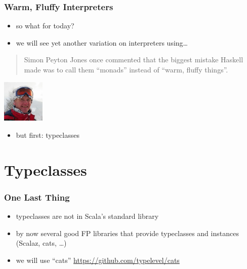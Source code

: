 \documentclass{beamer}
\begin{document}
\begin{frame}
  \frametitle{Warm, Fluffy Interpreters}
  \begin{itemize}
  \item so what for today?
  \item we will see yet another variation on interpreters using\ldots
  \end{itemize}
  \vspace{5mm}
  \begin{minipage}{0.75\linewidth}
    \begin{quote}
      Simon Peyton Jones once commented that the biggest mistake Haskell
      made was to call them ``monads'' instead of ``warm, fluffy things''.
    \end{quote}
  \end{minipage}
  \begin{minipage}{25mm}
    \includegraphics[width=2cm]{pics/spj-snow.jpg}
  \end{minipage}
  \vspace{5mm}
  \begin{itemize}
  \item but first: typeclasses
  \end{itemize}
\end{frame}

\section{Typeclasses}

\begin{frame}
  \frametitle{One Last Thing}
  \begin{itemize}
  \item typeclasses are not in Scala's standard library
  \item by now several good FP libraries that provide typeclasses and
    instances (Scalaz, cats, \ldots)
  \item we will use ``cats'' \url{https://github.com/typelevel/cats}
  \end{itemize}
\end{frame}
\end{document}
